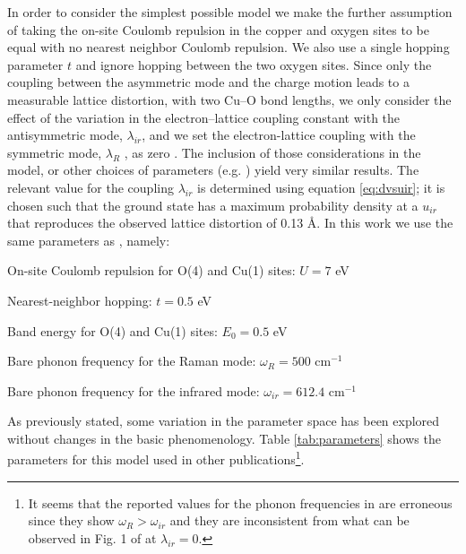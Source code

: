 In order to consider the simplest possible model we make the further assumption of taking the on-site Coulomb repulsion in the copper and oxygen sites to be equal with no nearest neighbor Coulomb repulsion. 
We also use a single hopping parameter $t$ and ignore hopping between the two oxygen sites. 
Since only the coupling between the asymmetric mode and the charge motion leads to a measurable lattice distortion, with two Cu–O bond lengths, we only consider the effect of the variation in the electron–lattice coupling constant with the antisymmetric mode, $\lambda_{ir}$, and we set the electron-lattice coupling with the symmetric mode, $\lambda_R$ , as zero \cite{Salkola1995}. 
The inclusion of those considerations in the model, or other choices of parameters (e.g. \cite{Salkola1994, Salkola1995}) yield very similar results.
The relevant value for the coupling $\lambda_{ir}$ is determined using equation \ref{eq:dvsuir}; it is chosen such that the ground state has a maximum probability density at a $u_{ir}$ that reproduces the observed lattice distortion of 0.13 \AA \cite{?}.
In this work we use the same parameters as \cite{DeLeon1999, Leon2008, MirandaMena2007,Mena2006}, namely:

\begin{itemize*}
\item On-site Coulomb repulsion for O(4) and Cu(1) sites: $U=7$ eV
\item Nearest-neighbor hopping: $t=0.5$ eV
\item Band energy for O(4) and Cu(1) sites: $E_0=0.5$ eV
\item Bare phonon frequency for the Raman mode: $\omega_R=500$ cm$^{-1}$
\item Bare phonon frequency for the infrared mode: $\omega_{ir}=612.4$ cm$^{-1}$
\end{itemize*}

As previously stated, some variation in the parameter space has been explored without changes in the basic phenomenology. Table \ref{tab:parameters} shows the parameters for this model used in other publications\footnote{It seems that the reported values for the phonon frequencies in \cite{Salkola1994, Salkola1995} are erroneous since they show $\omega_R > \omega_{ir}$ and they are inconsistent from what can be observed in Fig. 1 of \cite{Salkola1994} at $\lambda_{ir}=0$.}.

